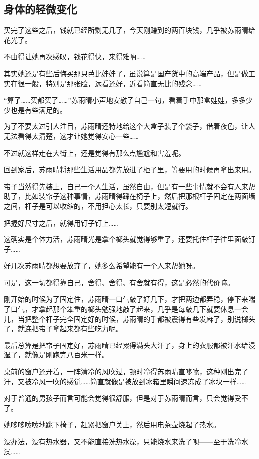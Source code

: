 \subsection{身体的轻微变化}

买完了这些之后，钱就已经所剩无几了，今天刚赚到的两百块钱，几乎被苏雨晴给花光了。

不由得让她再次感叹，钱花得快，来得难呐……

其实她还是有些后悔买那只芭比娃娃了，虽说算是国产货中的高端产品，但是做工实在很一般，特别是那张脸，远看还好，近看简直无比的残念……

“算了……买都买了……”苏雨晴小声地安慰了自己一句，看着手中那盒娃娃，多多少少也是有些满足的。

为了不要太过引人注目，苏雨晴还特地给这个大盒子装了个袋子，借着夜色，让人无法看得太清楚，这才让她觉得安心一些……

不过就这样走在大街上，还是觉得有那么点尴尬和害羞呢。

回到家后，苏雨晴将那些生活用品都先放进了柜子里，等要用的时候再拿出来用。

帘子当然得先装上，自己一个人生活，虽然自由，但是有一些事情就不会有人来帮助了，比如装帘子这种事情，苏雨晴得踩在椅子上，然后把那根杆子固定在两面墙之间，杆子是可以收缩的，不用担心太长，只要别太短就行。

把握好尺寸之后，就得用钉子钉上……

这确实是个体力活，苏雨晴光是拿个榔头就觉得够重了，还要托住杆子往里面敲钉子……

好几次苏雨晴都想要放弃了，她多么希望能有一个人来帮她呀。

可是，这一切都得靠自己，舍得、舍得、有舍就有得，这是必然的代价嘛。

刚开始的时候为了固定住，苏雨晴一口气敲了好几下，才把两边都弄稳，停下来喘了口气，才拿起那个笨重的榔头勉强地敲了起来，几乎是每敲几下就要休息一会儿，当把整个杆子完全固定好的时候，苏雨晴的手都被震得有些发麻了，别说榔头了，就连把帘子拿起来都有些吃力呢。

最后总算是把帘子固定好，苏雨晴已经累得满头大汗了，身上的衣服都被汗水给浸湿了，就像是刚跑完八百米一样。

桌前的窗户还开着，一阵清冷的风吹过，顿时冷得苏雨晴直哆嗦，这种刚出完了汗，又被冷风一吹的感觉……简直就像是被放到冰箱里瞬间速冻成了冰块一样……

对于普通的男孩子而言可能会觉得很舒服，但是对于苏雨晴而言，只会觉得受不了。

她哆哆嗦嗦地跳下椅子，赶紧把窗户关上，然后用电茶壶烧起了热水。

没办法，没有热水器，又不能直接洗热水澡，只能烧水来洗了呗——至于洗冷水澡……

